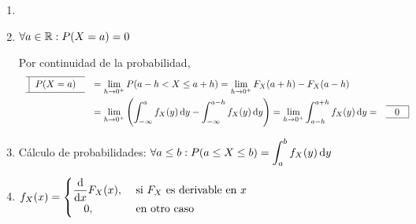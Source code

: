\begin{obs}
	\begin{enumerate}
		\item[]
		\item $\forall a \in \mathbb{R} : P(X=a) = 0$
		      \begin{dem}
			      Por continuidad de la probabilidad,
			      \[\begin{aligned}
					      \lbox{P(X=a)} & =\lim_{h \to 0^+} P(a-h<X\leq a+h) = \lim_{h\to0^+} F_X(a+h)-F_X(a-h)                                                                                                  \\
					                    & = \lim_{h \to 0^+} \left(\int_{-\infty}^{a} f_X(y) \odif{y} - \int_{-\infty}^{a-h} f_X(y) \odif{y}\right) = \lim_{h\to0^+} \int_{a-h}^{a+h} f_X(y) \odif{y} = \rbox{0}
				      \end{aligned}\]
		      \end{dem}
		\item Cálculo de probabilidades: $\ds\forall a \leq b : P(a\leq X\leq b) = \int_{a}^{b} f_X(y) \odif{y}$
		\item $\ds f_X(x) = \begin{cases}
				      \ds \odv{}{x} F_X(x), & \text{ si } F_X \text{ es derivable en } x \\
				      \ds \quad 0,          & \text{ en otro caso}
			      \end{cases}$
	\end{enumerate}
\end{obs}

